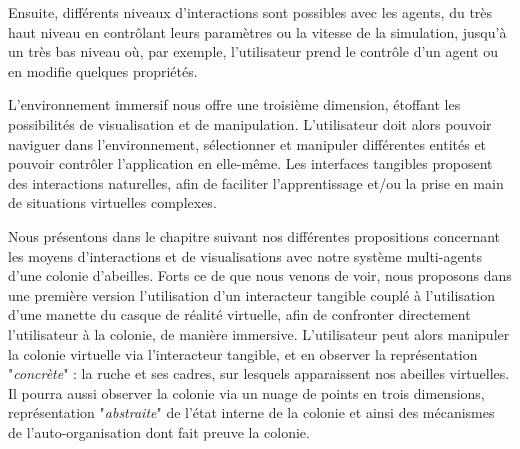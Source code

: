 		Ensuite, différents niveaux d'interactions sont possibles avec les agents, du très haut niveau en contrôlant leurs paramètres ou la vitesse de la simulation, jusqu'à un très bas niveau où, par exemple, l'utilisateur prend le contrôle d'un agent ou en modifie quelques propriétés.
		
		L'environnement immersif nous offre une troisième dimension, étoffant les possibilités de visualisation et de manipulation. L'utilisateur doit alors pouvoir naviguer dans l'environnement, sélectionner et manipuler différentes entités et pouvoir contrôler l'application en elle-même. Les interfaces tangibles proposent des interactions naturelles, afin de faciliter l'apprentissage et/ou la prise en main de situations virtuelles complexes.
		
		Nous présentons dans le chapitre suivant nos différentes propositions concernant les moyens d'interactions et de visualisations avec notre système multi-agents d'une colonie d'abeilles. Forts ce de que nous venons de voir, nous proposons dans une première version l'utilisation d'un interacteur tangible couplé à l'utilisation d'une manette du casque de réalité virtuelle, afin de confronter directement l'utilisateur à la colonie, de manière immersive.	
		L'utilisateur peut alors manipuler la colonie virtuelle via l'interacteur tangible, et en observer la représentation "\textit{concrète}" : la ruche et ses cadres, sur lesquels apparaissent nos abeilles virtuelles.
		Il pourra aussi observer la colonie via un nuage de points en trois dimensions, représentation "\textit{abstraite}" de l'état interne de la colonie et ainsi des mécanismes de l'auto-organisation dont fait preuve la colonie.